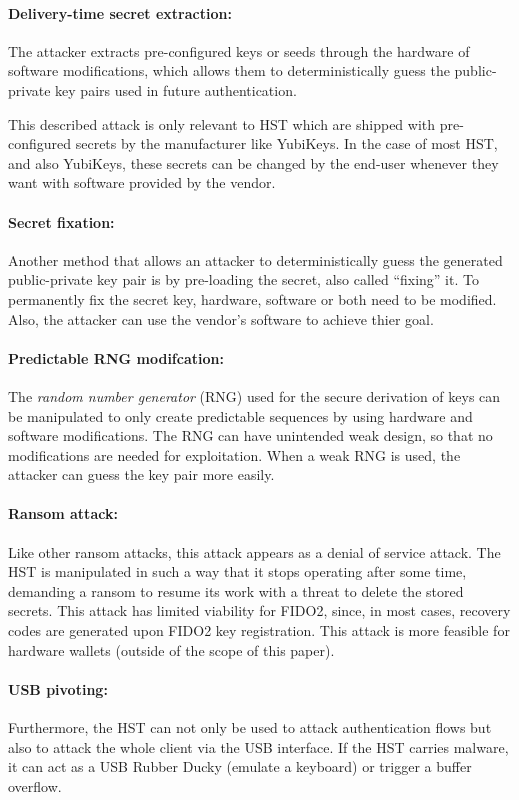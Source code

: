 \documentclass[runningheads]{llncs}
\begin{document}
\paragraph{Delivery-time secret extraction:}
The attacker extracts pre-configured keys or seeds through the hardware of software modifications, which allows them to deterministically guess the public-private key pairs used in future authentication.

This described attack is only relevant to HST which are shipped with pre-configured secrets by the manufacturer like YubiKeys. In the case of most HST, and also YubiKeys, these secrets can be changed by the end-user whenever they want with software provided by the vendor.

\paragraph{Secret fixation:}
Another method that allows an attacker to deterministically guess the generated public-private key pair is by pre-loading the secret, also called ``fixing''  it. To permanently fix the secret key, hardware, software or both need to be modified. Also, the attacker can use the vendor's software to achieve thier goal.

\paragraph{Predictable RNG modifcation:}
The \textit{random number generator} (RNG) used for the secure derivation of keys can be manipulated to only create predictable sequences by using hardware and software modifications. The RNG can have unintended weak design, so that no modifications are needed for exploitation. When a weak RNG is used, the attacker can guess the key pair more easily.

\paragraph{Ransom attack:}
Like other ransom attacks, this attack appears as a denial of service attack. The HST is manipulated in such a way that it stops operating after some time, demanding a ransom to resume its work with a threat to delete the stored secrets. This attack has limited viability for FIDO2, since, in most cases, recovery codes are generated upon FIDO2 key registration. This attack is more feasible for hardware wallets (outside of the scope of this paper).

\paragraph{USB pivoting:}
Furthermore, the HST can not only be used to attack authentication flows but also to attack the whole client via the USB interface. If the HST carries malware, it can act as a USB Rubber Ducky (emulate a keyboard) or trigger a buffer overflow.
\end{document}
